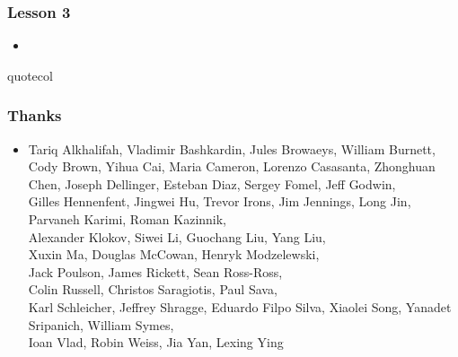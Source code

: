 \begin{frame}
  \MadLogo
  \frametitle{Lesson 3}

\begin{itemize}
\item {}
\end{itemize}

\vfill
\begin{beamercolorbox}[wd=\textwidth,center]{quotecol}
\Large {}
\end{beamercolorbox}
\vfill


\end{frame}


\begin{frame}
\MadLogo
\frametitle{Thanks}

\begin{itemize}
\item Tariq Alkhalifah, Vladimir Bashkardin, Jules Browaeys, William
  Burnett, Cody Brown, Yihua Cai, Maria Cameron, Lorenzo Casasanta,
  Zhonghuan Chen, Joseph Dellinger, Esteban Diaz, Sergey Fomel, Jeff
  Godwin, \\ Gilles Hennenfent, Jingwei Hu, Trevor Irons, Jim
  Jennings, Long Jin, Parvaneh Karimi, Roman Kazinnik, \\ Alexander
  Klokov, Siwei Li, Guochang Liu, Yang Liu,  \\ Xuxin Ma, Douglas
  McCowan, Henryk Modzelewski, \\ Jack Poulson, James Rickett, Sean
  Ross-Ross, \\ Colin Russell, Christos Saragiotis, Paul Sava, \\ Karl
  Schleicher, Jeffrey Shragge, Eduardo Filpo Silva, Xiaolei Song,
  Yanadet Sripanich, William Symes, \\ Ioan Vlad, Robin Weiss, Jia Yan, Lexing Ying
\end{itemize}
\end{frame}



